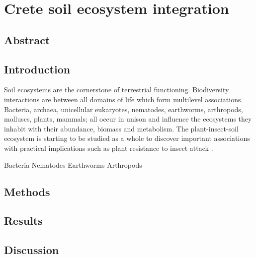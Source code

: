 % 
% 


\chapter{Crete soil ecosystem integration}
\label{cha:crete-soil}




\section{Abstract}

\section{Introduction}
\label{sec:crete-soil-intro}

Soil ecosystems are the cornerstone of terrestrial functioning.
Biodiversity interactions are between all domains of life which form
multilevel associations. Bacteria, archaea, unicellular eukaryotes, nematodes,
earthworms, arthropods, molluscs, plants, mammals; all occur in unison and 
influence the ecosystems they inhabit with their abundance, biomass \citep{bar2018biomass} and metabolism.
The plant-insect-soil ecosystem is starting to be studied as a whole to discover
important associations with practical implications such as plant resistance 
to insect attack \citep{plant-insect-soil2023}.


Bacteria \citep{Delgado-Baquerizo-atlas}
Nematodes \citep{vandenHoogen2019}
Earthworms \citep{Phillips2021}
Arthropods \citep{milo-arthropods}



\section{Methods}
\label{sec:crete-soil-method}

\section{Results}
\label{sec:crete-soil-results}

\section{Discussion}
\label{sec:crete-soil-discussion}

% 
